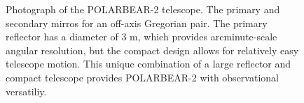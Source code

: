 \begin{figure}
    \centering
    \hfill
    \caption[POLARBEAR-2 telescope]{Photograph of the POLARBEAR-2 telescope. The primary and secondary mirros for an off-axis Gregorian pair. The primary reflector has a diameter of 3 m, which provides arcminute-scale angular resolution, but the compact design allows for relatively easy telescope motion. This unique combination of a large reflector and compact telescope provides POLARBEAR-2 with observational versatiliy.}
    \label{fig:pb2_telescope}
\end{figure}

